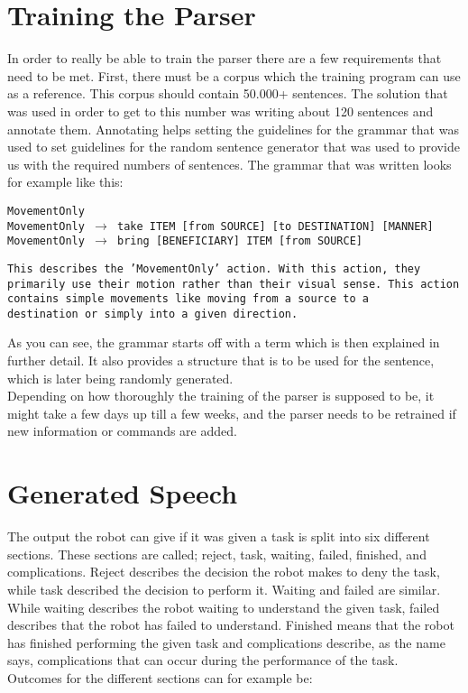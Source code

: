 \documentclass[main.tex]{subfiles}
\begin{document}
	\section{Training the Parser}
	In order to really be able to train the parser there are a few requirements that need to be met. First, there must be a corpus which the training program can use as a reference. This corpus should contain 50.000+ sentences. The solution that was used in order to get to this number was writing about 120 sentences and annotate them. Annotating helps setting the guidelines for the grammar that was used to set guidelines for the random sentence generator that was used to provide us with the required numbers of sentences.
	The grammar that was written looks for example like this:

		
		\texttt{MovementOnly\\
		MovementOnly $\rightarrow$ take ITEM [from SOURCE] [to DESTINATION] [MANNER]\\
		MovementOnly $\rightarrow$ bring [BENEFICIARY] ITEM [from SOURCE]\\}
		
		\texttt{This describes the 'MovementOnly' action.
		With this action, they primarily use their motion rather than their visual sense. This action contains simple movements like moving from a source to a\\ destination or simply into a given direction.}
		



	As you can see, the grammar starts off with a term which is then explained in further detail. It also provides a structure that is to be used for the sentence, which is later being randomly generated.\\ 
	Depending on how thoroughly the training of the parser is supposed to be, it might take a few days up till a few weeks, and the parser needs to be retrained if new information or commands are added.

	\section{Generated Speech}
	The output the robot can give if it was given a task is split into six different sections. These sections are called; reject, task, waiting, failed, finished, and complications. Reject describes the decision the robot makes to deny the task, while task described the decision to perform it. Waiting and failed are similar. While waiting describes the robot waiting to understand the 
	given task, failed describes that the robot has failed to understand. Finished means that the robot has finished performing the given task and complications describe, as the name says, complications that can occur during the performance of the task.\\ 
	Outcomes for the different sections can for example be:
			
\end{document}
